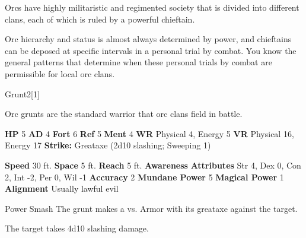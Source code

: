       Orcs have highly militaristic and regimented society that is divided into different clans, each of which is ruled by a powerful chieftain.
    
      Orc hierarchy and status is almost always determined by power, and chieftains can be deposed at specific intervals in a personal trial by combat.
      You know the general patterns that determine when these personal trials by combat are permissible for local orc clans.
    

      
  \begin{monsubsection}{Grunt}{2}[1]
    \vspace{-1em}\vspace{-1em}
    \vspace{0em}

    
          Orc grunts are the standard warrior that orc clans field in battle.
        

    \begin{spellcontent}
      \begin{spelltargetinginfo}
        \pari \textbf{HP} 5 \monsep
          \textbf{AD} 4 \monsep
          \textbf{Fort} 6 \monsep
          \textbf{Ref} 5 \monsep
          \textbf{Ment} 4
        \pari \textbf{WR} Physical 4, Energy 5 \monsep
        \textbf{VR} Physical 16, Energy 17
        \pari \textbf{Strike:}
            Greataxe  (2d10 slashing; Sweeping 1)
      \end{spelltargetinginfo}
    \end{spellcontent}
    \begin{monsterfooter}
      \pari \textbf{Speed} 30 ft. \monsep
        \textbf{Space} 5 ft. \monsep
        \textbf{Reach} 5 ft.
      \pari \textbf{Awareness} 
      \pari \textbf{Attributes}
        Str 4, Dex 0,
        Con 2, Int -2,
        Per 0, Wil -1
      \pari \textbf{Accuracy} 2 \monsep
        \textbf{Mundane Power} 5 \monsep
      \textbf{Magical Power} 1
      \pari \textbf{Alignment} Usually lawful evil
    \end{monsterfooter}
  \end{monsubsection}
  \begin{freeability}{Power Smash}
       The grunt makes a 
         vs. Armor
        with its greataxe against the target.
    
    \hit The target takes 4d10 slashing damage.
    \end{freeability}
  

